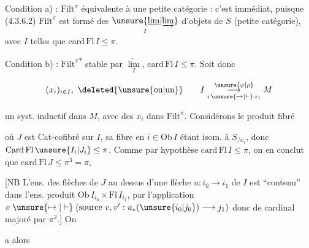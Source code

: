 
Condition a) : $\mathrm{Filt}^\pi$ équivalente à une petite catégorie : c'est immédiat, puisque  (4.3.6.2) $\mathrm{Filt}^\pi$ est formé des $\underset{I}{\unsure{\underline{\lim}|\underrightarrow{\lim}}}$  d'objets de $S$ (petite catégorie), avec $I$ telles que $\mathrm{card}\,\mathrm{Fl}\,I\leq\pi$.

Condition b) : $\mathrm{Filt}^\pi$\textsuperscript{*} stable par $\underset{I}{\underrightarrow{\lim}}$, $\mathrm{card}\,\mathrm{Fl}\,I\leq\pi$. Soit donc


\[
(x_i)_{i\in I},\ \deleted{\unsure{\text{ou}|\text{un}}}\qquad I\mathrel{\mathop{\longrightarrow}\limits^{\unsure{\varphi|\rho}}_{i\,\unsure{\mapsto|\vdash}\,x_i}}M
\]

un syst. inductif dans $M$, avec des $x_i$ dans $\mathrm{Filt}^\pi$. Considérons le produit fibré

\diagram{\[
\begin{tikzcd}[ampersand replacement=\&,column sep=large,row sep=large]
I\arrow[d,dash,"\varphi"'] \& S_{/I}=J\arrow[l,"\text{cofibré}"']\arrow[d]\arrow[dr,dashed,"\psi"] \& \\
M \& S_{/M}\arrow[l,"\text{but}"',"\text{Cat-cofibrée}"]\arrow[r,"\text{source}"] \& S\unsure{\lhook\joinrel-|\subset|\hookrightarrow}M
\end{tikzcd},
\tag*{(4.3.6.4)}
\]}

où $J$ est Cat-cofibré sur $I$, sa fibre en $i\in\mathrm{Ob}\,I$ étant isom. à $S_{/x_i}$, donc $\mathrm{Card}\,\mathrm{Fl}\,\unsure{I_i|J_i}\leq\pi$. Comme par hypothèse $\mathrm{card}\,\mathrm{Fl}\,I\leq\pi$, on en conclut que $\mathrm{card}\,\mathrm{Fl}\,J\leq\pi^3=\pi$,

[NB L'ens. des flèches  de $J$ au dessus d'une flèche $u:i_0\longrightarrow i_1$ de $I$ est ``contenu'' dans l'ens. produit $\mathrm{Ob}\,I_{i_0}\times\mathrm{Fl}\,I_{i_1}$, par l'application $v\mathrel{\unsure{\mapsto|\vdash}}(\text{source }v,v':u_*(\unsure{i_0|j_0})\longrightarrow j_1)$ donc de cardinal majoré par $\pi^2$.]  On


a alors

